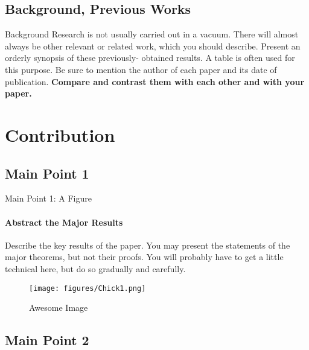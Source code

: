 \documentclass[11pt]{beamer}              %
\begin{document}

\subsection{Background, Previous Works}
\begin{frame}{Background}
Research is not usually carried out in a vacuum. There will almost always be other relevant or related work, which you should describe. Present an orderly synopsis of these previously- obtained results. A table is often used for this purpose. Be sure to mention the author of each paper and its date of publication. \textbf{Compare and contrast them with each other and with your paper.}
\end{frame}




\section{Contribution}
\subsection{Main Point 1}
\begin{frame}{Main Point 1: A Figure}
\framesubtitle{Abstract the Major Results}
Describe the key results of the paper. You may present the statements of the major theorems, but not their proofs. You will probably have to get a little technical here, but do so gradually and carefully.

\begin{figure}
    \centering
    \texttt{[image: figures/Chick1.png]}
    \caption{Awesome Image}
    \label{fig:awesome_image}
\end{figure}
\note{
}
\end{frame}


\subsection{Main Point 2}
\end{document}

